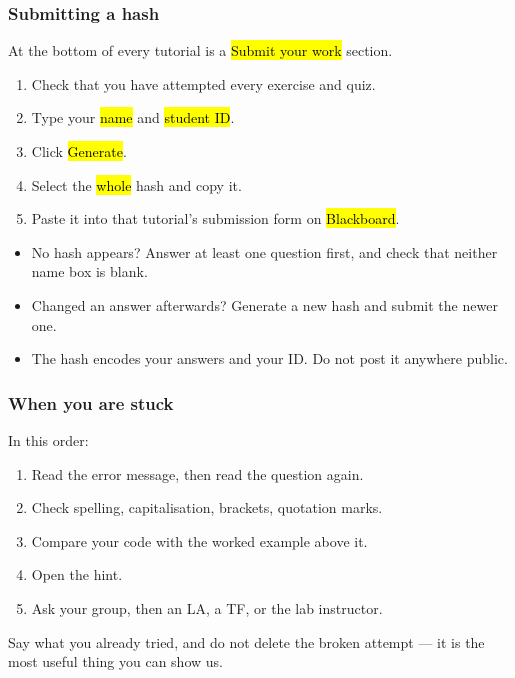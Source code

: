 \documentclass[slidestop,compress,mathserif]{beamer}
\begin{document}
\begin{frame}
\frametitle{Submitting a hash}

At the bottom of every tutorial is a \hl{Submit your work} section.

\vspace{0.6em}
\begin{enumerate}
  \item Check that you have attempted every exercise and quiz.
  \item Type your \hl{name} and \hl{student ID}.
  \item Click \hl{Generate}.
  \item Select the \hl{whole} hash and copy it.
  \item Paste it into that tutorial's submission form on
        \hl{Blackboard}.
\end{enumerate}

\vspace{0.4em}
\begin{itemize}\footnotesize
  \item No hash appears? Answer at least one question first, and check
        that neither name box is blank.
  \item Changed an answer afterwards? Generate a new hash and submit the
        newer one.
  \item The hash encodes your answers and your ID. Do not post it
        anywhere public.
\end{itemize}

\end{frame}



\begin{frame}
\frametitle{When you are stuck}

In this order:

\begin{enumerate}
  \item Read the error message, then read the question again.
  \item Check spelling, capitalisation, brackets, quotation marks.
  \item Compare your code with the worked example above it.
  \item Open the hint.
  \item Ask your group, then an LA, a TF, or the lab instructor.
\end{enumerate}

Say what you already tried, and do not delete the broken attempt --- it
is the most useful thing you can show us.


\end{frame}
\end{document}
